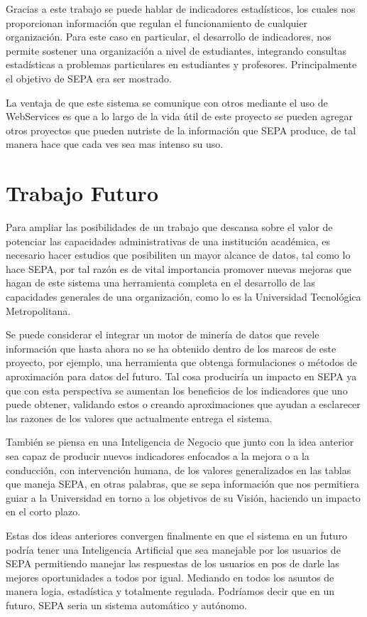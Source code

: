 \documentclass[a4paper,12pt,openany,oneside]{book}
\begin{document}
Gracias a este trabajo se puede hablar de indicadores estadísticos, los cuales nos proporcionan información que regulan el funcionamiento de cualquier organización. Para este caso en particular, el desarrollo de indicadores, nos permite sostener una organización a nivel de estudiantes, integrando consultas estadísticas a problemas particulares en estudiantes y profesores. Principalmente el objetivo de SEPA era ser mostrado.

La ventaja de que este sistema se comunique con otros mediante el uso de WebServices es que a lo largo de la vida útil de este proyecto se pueden agregar otros proyectos que pueden nutriste de la información que SEPA produce, de tal manera hace que cada ves sea mas intenso su uso.
\section{Trabajo Futuro}
Para ampliar las posibilidades de un trabajo que descansa sobre el valor de potenciar las capacidades administrativas de una institución académica, es necesario hacer estudios que posibiliten un mayor alcance de datos, tal como lo hace SEPA, por tal razón es de vital importancia promover nuevas mejoras que hagan de este sistema una herramienta completa en el desarrollo de las capacidades generales de una organización, como lo es la Universidad Tecnológica Metropolitana.

Se puede considerar el integrar un motor de minería de datos que revele información que hasta ahora no se ha obtenido dentro de los marcos de este proyecto, por ejemplo, una herramienta que obtenga formulaciones o métodos de aproximación para datos del futuro. Tal cosa produciría un impacto en SEPA ya que con esta perspectiva se aumentan los beneficios de los indicadores que uno puede obtener, validando estos o creando aproximaciones que ayudan a esclarecer las razones de los valores que actualmente entrega el sistema.

También se piensa en una Inteligencia de Negocio que junto con la idea anterior sea capaz de producir nuevos indicadores enfocados a la mejora o a la conducción, con intervención humana, de los valores generalizados en las tablas que maneja SEPA, en otras palabras, que se sepa información que nos permitiera guiar a la Universidad en torno a los objetivos de su Visión, haciendo un impacto en el corto plazo.

Estas dos ideas anteriores convergen finalmente en que el sistema en un futuro podría tener una Inteligencia Artificial que sea manejable por los usuarios de SEPA permitiendo manejar las respuestas de los usuarios en pos de darle las mejores oportunidades a todos por igual. Mediando en todos los asuntos de manera logia, estadística y totalmente regulada. Podríamos decir que en un futuro, SEPA seria un sistema automático y autónomo.
\end{document}
